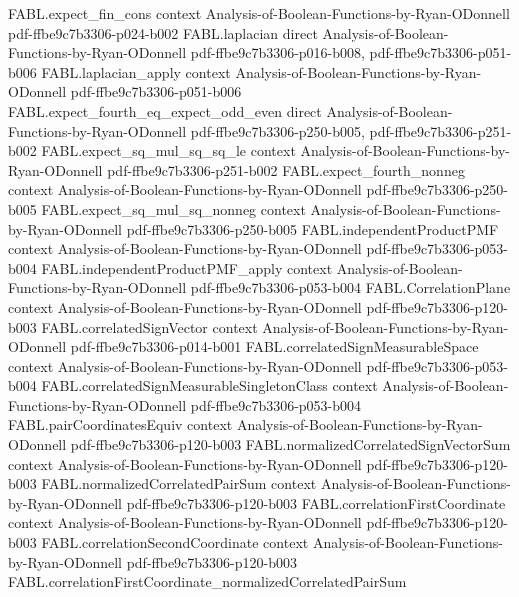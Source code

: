 \begin{theorem}
\proofstep
  {FABL.expect_fin_cons}
  {context}
  {Analysis-of-Boolean-Functions-by-Ryan-ODonnell}
  {pdf-ffbe9c7b3306-p024-b002}
\proofstep
  {FABL.laplacian}
  {direct}
  {Analysis-of-Boolean-Functions-by-Ryan-ODonnell}
  {pdf-ffbe9c7b3306-p016-b008,
    pdf-ffbe9c7b3306-p051-b006}
\proofstep
  {FABL.laplacian_apply}
  {context}
  {Analysis-of-Boolean-Functions-by-Ryan-ODonnell}
  {pdf-ffbe9c7b3306-p051-b006}
\proofstep
  {FABL.expect_fourth_eq_expect_odd_even}
  {direct}
  {Analysis-of-Boolean-Functions-by-Ryan-ODonnell}
  {pdf-ffbe9c7b3306-p250-b005,
    pdf-ffbe9c7b3306-p251-b002}
\proofstep
  {FABL.expect_sq_mul_sq_sq_le}
  {context}
  {Analysis-of-Boolean-Functions-by-Ryan-ODonnell}
  {pdf-ffbe9c7b3306-p251-b002}
\proofstep
  {FABL.expect_fourth_nonneg}
  {context}
  {Analysis-of-Boolean-Functions-by-Ryan-ODonnell}
  {pdf-ffbe9c7b3306-p250-b005}
\proofstep
  {FABL.expect_sq_mul_sq_nonneg}
  {context}
  {Analysis-of-Boolean-Functions-by-Ryan-ODonnell}
  {pdf-ffbe9c7b3306-p250-b005}
\proofstep
  {FABL.independentProductPMF}
  {context}
  {Analysis-of-Boolean-Functions-by-Ryan-ODonnell}
  {pdf-ffbe9c7b3306-p053-b004}
\proofstep
  {FABL.independentProductPMF_apply}
  {context}
  {Analysis-of-Boolean-Functions-by-Ryan-ODonnell}
  {pdf-ffbe9c7b3306-p053-b004}
\proofstep
  {FABL.CorrelationPlane}
  {context}
  {Analysis-of-Boolean-Functions-by-Ryan-ODonnell}
  {pdf-ffbe9c7b3306-p120-b003}
\proofstep
  {FABL.correlatedSignVector}
  {context}
  {Analysis-of-Boolean-Functions-by-Ryan-ODonnell}
  {pdf-ffbe9c7b3306-p014-b001}
\proofstep
  {FABL.correlatedSignMeasurableSpace}
  {context}
  {Analysis-of-Boolean-Functions-by-Ryan-ODonnell}
  {pdf-ffbe9c7b3306-p053-b004}
\proofstep
  {FABL.correlatedSignMeasurableSingletonClass}
  {context}
  {Analysis-of-Boolean-Functions-by-Ryan-ODonnell}
  {pdf-ffbe9c7b3306-p053-b004}
\proofstep
  {FABL.pairCoordinatesEquiv}
  {context}
  {Analysis-of-Boolean-Functions-by-Ryan-ODonnell}
  {pdf-ffbe9c7b3306-p120-b003}
\proofstep
  {FABL.normalizedCorrelatedSignVectorSum}
  {context}
  {Analysis-of-Boolean-Functions-by-Ryan-ODonnell}
  {pdf-ffbe9c7b3306-p120-b003}
\proofstep
  {FABL.normalizedCorrelatedPairSum}
  {context}
  {Analysis-of-Boolean-Functions-by-Ryan-ODonnell}
  {pdf-ffbe9c7b3306-p120-b003}
\proofstep
  {FABL.correlationFirstCoordinate}
  {context}
  {Analysis-of-Boolean-Functions-by-Ryan-ODonnell}
  {pdf-ffbe9c7b3306-p120-b003}
\proofstep
  {FABL.correlationSecondCoordinate}
  {context}
  {Analysis-of-Boolean-Functions-by-Ryan-ODonnell}
  {pdf-ffbe9c7b3306-p120-b003}
\proofstep
  {FABL.correlationFirstCoordinate_normalizedCorrelatedPairSum}

\end{theorem}
